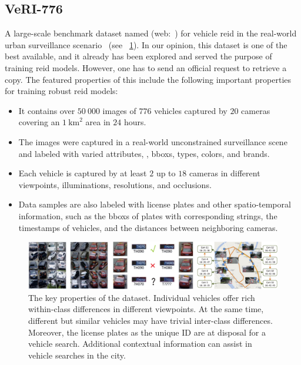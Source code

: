 \subsection{VeRI-776}
\label{ssec:DatasetVeRI776}

A large-scale benchmark dataset named \verisss{} (web:~\cite{webveridataset}) for vehicle \gls{reid} in the real-world urban surveillance scenario~\cite{liu2018provid} (see \figtext{}~\ref{fig:VeRI776Dataset}). In our opinion, this dataset is one of the best available, and it already has been explored and served the purpose of training \gls{reid} models. However, one has to send an official request to retrieve a copy. The featured properties of this include the following important properties for training robust \gls{reid} models:

\begin{itemize}
    \item It contains over $50\ 000$ images of $776$ vehicles captured by $20$ cameras covering an $1\  \text{km}^2$ area in $24$ hours.
    \item The images were captured in a real-world unconstrained surveillance scene and labeled with varied attributes, \egtext{}, \glspl{bbox}, types, colors, and brands.
    \item Each vehicle is captured by at least $2$ up to $18$ cameras in different viewpoints, illuminations, resolutions, and occlusions.
    \item Data samples are also labeled with license plates and other spatio-temporal information, such as the \glspl{bbox} of plates with corresponding strings, the timestamps of vehicles, and the distances between neighboring cameras.
\end{itemize}

\begin{figure}[t]
    \centerline{\includegraphics[width=\linewidth]{figures/datasets/veri776__overview.pdf}}
    \caption[\verisss{} dataset]{The key properties of the \verisss{} dataset. Individual vehicles offer rich within-class differences in different viewpoints. At the same time, different but similar vehicles may have trivial inter-class differences. Moreover, the license plates as the unique ID are at disposal for a vehicle search. Additional contextual information can assist in vehicle searches in the city. }
    \label{fig:VeRI776Dataset}
\end{figure}
